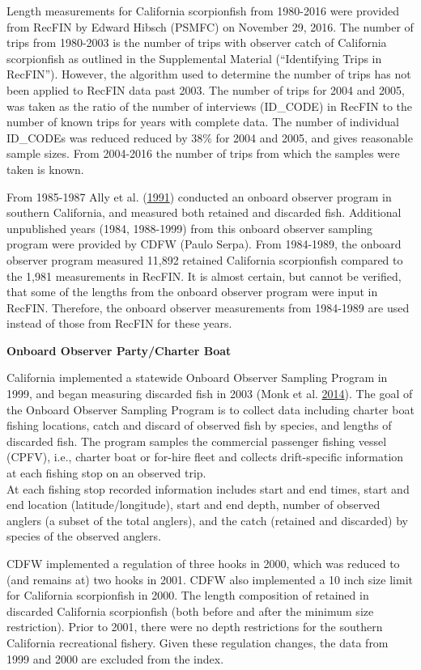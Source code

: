 \documentclass[12pt,]{article}
\begin{document}
Length measurements for California scorpionfish from 1980-2016 were
provided from RecFIN by Edward Hibsch (PSMFC) on November 29, 2016. The
number of trips from 1980-2003 is the number of trips with observer
catch of California scorpionfish as outlined in the Supplemental
Material (``Identifying Trips in RecFIN''). However, the algorithm used
to determine the number of trips has not been applied to RecFIN data
past 2003. The number of trips for 2004 and 2005, was taken as the ratio
of the number of interviews (ID\_CODE) in RecFIN to the number of known
trips for years with complete data. The number of individual ID\_CODEs
was reduced reduced by 38\% for 2004 and 2005, and gives reasonable
sample sizes. From 2004-2016 the number of trips from which the samples
were taken is known.

From 1985-1987 Ally et al. (\protect\hyperlink{ref-Ally1991}{1991})
conducted an onboard observer program in southern California, and
measured both retained and discarded fish. Additional unpublished years
(1984, 1988-1999) from this onboard observer sampling program were
provided by CDFW (Paulo Serpa). From 1984-1989, the onboard observer
program measured 11,892 retained California scorpionfish compared to the
1,981 measurements in RecFIN. It is almost certain, but cannot be
verified, that some of the lengths from the onboard observer program
were input in RecFIN. Therefore, the onboard observer measurements from
1984-1989 are used instead of those from RecFIN for these years.

\textbf{Onboard Observer Party/Charter Boat}

California implemented a statewide Onboard Observer Sampling Program in
1999, and began measuring discarded fish in 2003 (Monk et al.
\protect\hyperlink{ref-Monk2014}{2014}). The goal of the Onboard
Observer Sampling Program is to collect data including charter boat
fishing locations, catch and discard of observed fish by species, and
lengths of discarded fish. The program samples the commercial passenger
fishing vessel (CPFV), i.e., charter boat or for-hire fleet and collects
drift-specific information at each fishing stop on an observed trip.\\
At each fishing stop recorded information includes start and end times,
start and end location (latitude/longitude), start and end depth, number
of observed anglers (a subset of the total anglers), and the catch
(retained and discarded) by species of the observed anglers.

CDFW implemented a regulation of three hooks in 2000, which was reduced
to (and remains at) two hooks in 2001. CDFW also implemented a 10 inch
size limit for California scorpionfish in 2000. The length composition
of retained in discarded California scorpionfish (both before and after
the minimum size restriction). Prior to 2001, there were no depth
restrictions for the southern California recreational fishery. Given
these regulation changes, the data from 1999 and 2000 are excluded from
the index.
\end{document}
